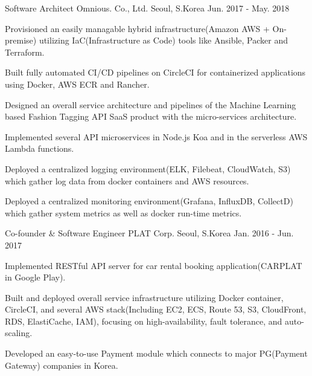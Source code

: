
\begin{cventries}

  \cventry
  {Software Architect} %
  {Omnious. Co., Ltd.} %
  {Seoul, S.Korea} %
  {Jun. 2017 - May. 2018} %
  {
    \begin{cvitems} %
    \item {Provisioned an easily managable hybrid infrastructure(Amazon AWS + On-premise) utilizing
      IaC(Infrastructure as Code) tools like Ansible, Packer and Terraform.}
    \item {Built fully automated CI/CD pipelines on CircleCI for containerized applications using Docker, AWS
      ECR and Rancher.}
    \item {Designed an overall service architecture and pipelines of the Machine Learning based Fashion
      Tagging API SaaS product with the micro-services architecture.}
    \item {Implemented several API microservices in Node.js Koa and in the serverless AWS Lambda functions.}
    \item {Deployed a centralized logging environment(ELK, Filebeat, CloudWatch, S3) which gather log data
      from docker containers and AWS resources.}
    \item {Deployed a centralized monitoring environment(Grafana, InfluxDB, CollectD) which gather system
      metrics as well as docker run-time metrics.}
    \end{cvitems}
  }

  \cventry
  {Co-founder \& Software Engineer} %
  {PLAT Corp.} %
  {Seoul, S.Korea} %
  {Jan. 2016 - Jun. 2017} %
  {
    \begin{cvitems} %
    \item {Implemented RESTful API server for car rental booking application(CARPLAT in Google Play).}
    \item {Built and deployed overall service infrastructure utilizing Docker container, CircleCI, and
        several AWS stack(Including EC2, ECS, Route 53, S3, CloudFront, RDS, ElastiCache, IAM), focusing on
      high-availability, fault tolerance, and auto-scaling.}
    \item {Developed an easy-to-use Payment module which connects to major PG(Payment Gateway) companies in Korea.}
    \end{cvitems}
  }


\end{cventries}
